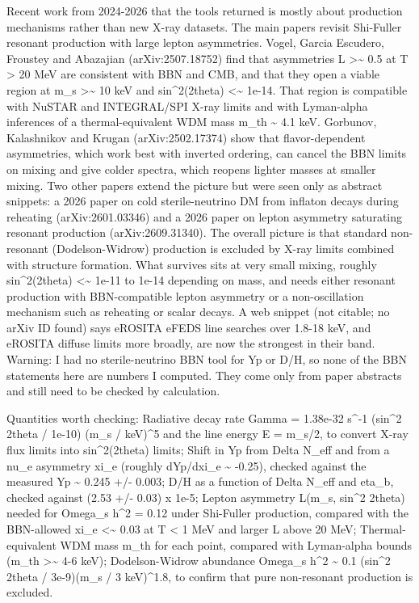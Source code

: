 \documentclass[11pt,a4paper]{article}
\begin{document}
Recent work from 2024-2026 that the tools returned is mostly about production mechanisms rather than new X-ray datasets. The main papers revisit Shi-Fuller resonant production with large lepton asymmetries. Vogel, Garcia Escudero, Froustey and Abazajian (arXiv:2507.18752) find that asymmetries L \textgreater{}\textasciitilde{} 0.5 at T \textgreater{} 20 MeV are consistent with BBN and CMB, and that they open a viable region at m\_s \textgreater{}\textasciitilde{} 10 keV and sin\textasciicircum{}2(2theta) \textless{}\textasciitilde{} 1e-14. That region is compatible with NuSTAR and INTEGRAL/SPI X-ray limits and with Lyman-alpha inferences of a thermal-equivalent WDM mass m\_th \textasciitilde{} 4.1 keV. Gorbunov, Kalashnikov and Krugan (arXiv:2502.17374) show that flavor-dependent asymmetries, which work best with inverted ordering, can cancel the BBN limits on mixing and give colder spectra, which reopens lighter masses at smaller mixing. Two other papers extend the picture but were seen only as abstract snippets: a 2026 paper on cold sterile-neutrino DM from inflaton decays during reheating (arXiv:2601.03346) and a 2026 paper on lepton asymmetry saturating resonant production (arXiv:2609.31340). The overall picture is that standard non-resonant (Dodelson-Widrow) production is excluded by X-ray limits combined with structure formation. What survives sits at very small mixing, roughly sin\textasciicircum{}2(2theta) \textless{}\textasciitilde{} 1e-11 to 1e-14 depending on mass, and needs either resonant production with BBN-compatible lepton asymmetry or a non-oscillation mechanism such as reheating or scalar decays. A web snippet (not citable; no arXiv ID found) says eROSITA eFEDS line searches over 1.8-18 keV, and eROSITA diffuse limits more broadly, are now the strongest in their band. Warning: I had no sterile-neutrino BBN tool for Yp or D/H, so none of the BBN statements here are numbers I computed. They come only from paper abstracts and still need to be checked by calculation.

Quantities worth checking: Radiative decay rate Gamma = 1.38e-32 s\textasciicircum{}-1 (sin\textasciicircum{}2 2theta / 1e-10) (m\_s / keV)\textasciicircum{}5 and the line energy E = m\_s/2, to convert X-ray flux limits into sin\textasciicircum{}2(2theta) limits; Shift in Yp from Delta N\_eff and from a nu\_e asymmetry xi\_e (roughly dYp/dxi\_e \textasciitilde{} -0.25), checked against the measured Yp \textasciitilde{} 0.245 +/- 0.003; D/H as a function of Delta N\_eff and eta\_b, checked against (2.53 +/- 0.03) x 1e-5; Lepton asymmetry L(m\_s, sin\textasciicircum{}2 2theta) needed for Omega\_s h\textasciicircum{}2 = 0.12 under Shi-Fuller production, compared with the BBN-allowed \textbar{}xi\_e\textbar{} \textless{}\textasciitilde{} 0.03 at T \textless{} 1 MeV and larger L above 20 MeV; Thermal-equivalent WDM mass m\_th for each point, compared with Lyman-alpha bounds (m\_th \textgreater{}\textasciitilde{} 4-6 keV); Dodelson-Widrow abundance Omega\_s h\textasciicircum{}2 \textasciitilde{} 0.1 (sin\textasciicircum{}2 2theta / 3e-9)(m\_s / 3 keV)\textasciicircum{}1.8, to confirm that pure non-resonant production is excluded.
\end{document}
